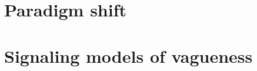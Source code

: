 \documentclass[a4paper]{article}
\begin{document}
\section{Paradigm shift}
\label{sec:Wittgenstein-and-signaling}

\section{Signaling models of vagueness}
\label{sec:vague-signaling}


\printbibliography
\end{document}
